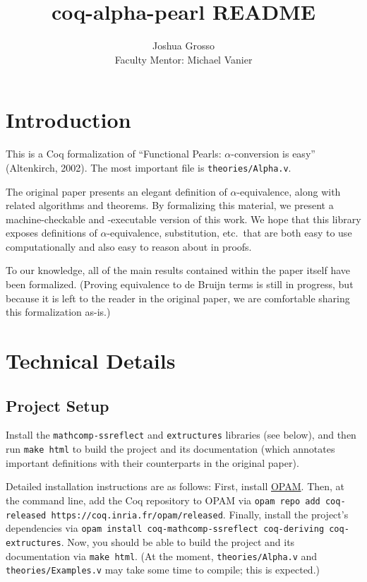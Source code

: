 \documentclass{article}
\title{coq-alpha-pearl README}
\author{Joshua Grosso \\ Faculty Mentor: Michael Vanier}
\begin{document}
\maketitle

\section{Introduction}

This is a Coq formalization of ``Functional Pearls: $\alpha$-conversion is easy'' (Altenkirch,
2002). The most important file is \verb|theories/Alpha.v|.

The original paper presents an elegant definition of $\alpha$-equivalence, along with related
algorithms and theorems. By formalizing this material, we present a machine-checkable and
-executable version of this work. We hope that this library exposes definitions of
$\alpha$-equivalence, substitution, etc.\ that are both easy to use computationally and also easy to
reason about in proofs.

To our knowledge, all of the main results contained within the paper itself have been formalized.
(Proving equivalence to de Bruijn terms is still in progress, but because it is left to the reader
in the original paper, we are comfortable sharing this formalization as-is.)

\section{Technical Details}

\subsection{Project Setup}

Install the \verb|mathcomp-ssreflect| and \verb|extructures| libraries (see below), and then run
\verb|make html| to build the project and its documentation (which annotates important definitions
with their counterparts in the original paper).

Detailed installation instructions are as follows: First, install
\href{https://opam.ocaml.org/doc/Install.html}{OPAM}. Then, at the command line, add the Coq
repository to OPAM via \verb|opam repo add coq-released https://coq.inria.fr/opam/released|.
Finally, install the project's dependencies via
\verb|opam install coq-mathcomp-ssreflect coq-deriving coq-extructures|. Now, you should be able to build the
project and its documentation via \verb|make html|. (At the moment, \verb|theories/Alpha.v| and
\verb|theories/Examples.v| may take some time to compile; this is expected.)
\end{document}
